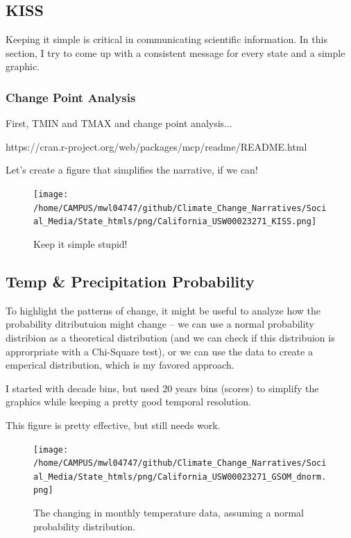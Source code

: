 \documentclass{article}\usepackage[]{graphicx}\usepackage[]{color}
\begin{document}
\subsection{KISS}

Keeping it simple is critical in communicating scientific information. In this section, I try to come up with a consistent message for every state and a simple graphic. 

\subsubsection{Change Point Analysis}
First, TMIN and TMAX and change point analysis...

https://cran.r-project.org/web/packages/mcp/readme/README.html



Let's create a figure that simplifies the narrative, if we can!



\begin{figure}
\texttt{[image: /home/CAMPUS/mwl04747/github/Climate\_Change\_Narratives/Social\_Media/State\_htmls/png/California\_USW00023271\_KISS.png]}
\caption{Keep it simple stupid!}
\label{fig:GSOM-KISS}
\end{figure}

\subsection{Temp \& Precipitation Probability}

To highlight the patterns of change, it might be useful to analyze how the probability ditributuion might change -- we can use a normal probability distribion as a theoretical distribution (and we can check if this distribuion is approrpriate with a Chi-Square test), or we can use the data to create a emperical distribution, which is my favored approach. 

I started with decade bins, but used 20 years bins (scores) to simplify the graphics while keeping a pretty good temporal resolution.



This figure is pretty effective, but still needs work. 

\begin{figure}
\texttt{[image: /home/CAMPUS/mwl04747/github/Climate\_Change\_Narratives/Social\_Media/State\_htmls/png/California\_USW00023271\_GSOM\_dnorm.png]}
\caption{The changing in monthly temperature data, assuming a normal probability distribution.}
\label{fig:GSOM_dnorm}
\end{figure}
\end{document}
